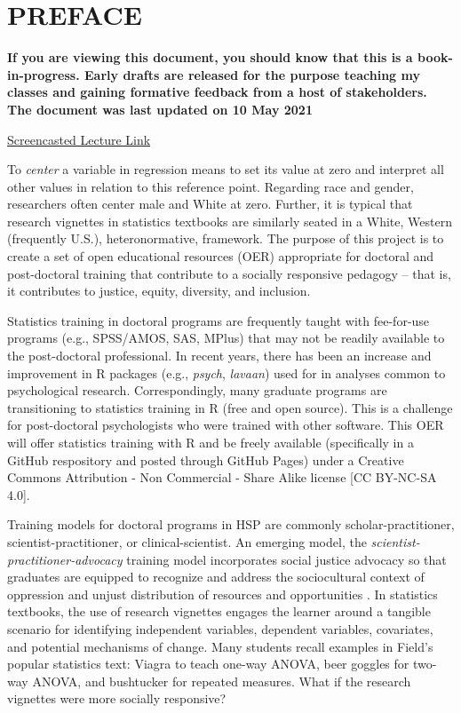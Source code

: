 \documentclass[
  english,
]{book}
\begin{document}
\hypertarget{preface}{%
\chapter*{PREFACE}\label{preface}}

\textbf{If you are viewing this document, you should know that this is a book-in-progress. Early drafts are released for the purpose teaching my classes and gaining formative feedback from a host of stakeholders. The document was last updated on 10 May 2021}

\href{https://spu.hosted.panopto.com/Panopto/Pages/Viewer.aspx?id=c932455e-ef06-444a-bdca-acf7012d759a}{Screencasted Lecture Link}

To \emph{center} a variable in regression means to set its value at zero and interpret all other values in relation to this reference point. Regarding race and gender, researchers often center male and White at zero. Further, it is typical that research vignettes in statistics textbooks are similarly seated in a White, Western (frequently U.S.), heteronormative, framework. The purpose of this project is to create a set of open educational resources (OER) appropriate for doctoral and post-doctoral training that contribute to a socially responsive pedagogy -- that is, it contributes to justice, equity, diversity, and inclusion.

Statistics training in doctoral programs are frequently taught with fee-for-use programs (e.g., SPSS/AMOS, SAS, MPlus) that may not be readily available to the post-doctoral professional. In recent years, there has been an increase and improvement in R packages (e.g., \emph{psych}, \emph{lavaan}) used for in analyses common to psychological research. Correspondingly, many graduate programs are transitioning to statistics training in R (free and open source). This is a challenge for post-doctoral psychologists who were trained with other software. This OER will offer statistics training with R and be freely available (specifically in a GitHub respository and posted through GitHub Pages) under a Creative Commons Attribution - Non Commercial - Share Alike license {[}CC BY-NC-SA 4.0{]}.

Training models for doctoral programs in HSP are commonly scholar-practitioner, scientist-practitioner, or clinical-scientist. An emerging model, the \emph{scientist-practitioner-advocacy} training model incorporates social justice advocacy so that graduates are equipped to recognize and address the sociocultural context of oppression and unjust distribution of resources and opportunities \citep{mallinckrodt_scientist-practitioner-advocate_2014}. In statistics textbooks, the use of research vignettes engages the learner around a tangible scenario for identifying independent variables, dependent variables, covariates, and potential mechanisms of change. Many students recall examples in Field's \citeyearpar{field_discovering_2012} popular statistics text: Viagra to teach one-way ANOVA, beer goggles for two-way ANOVA, and bushtucker for repeated measures. What if the research vignettes were more socially responsive?
\end{document}
